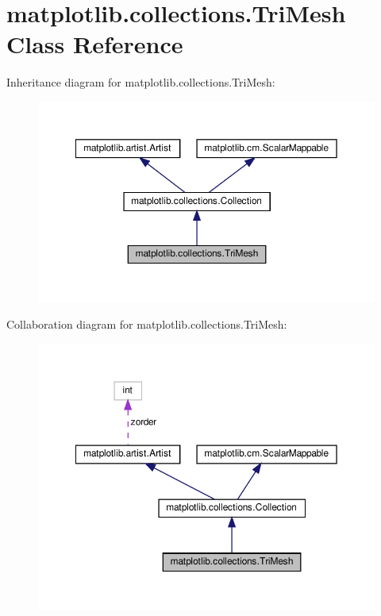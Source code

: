 \hypertarget{classmatplotlib_1_1collections_1_1TriMesh}{}\section{matplotlib.\+collections.\+Tri\+Mesh Class Reference}
\label{classmatplotlib_1_1collections_1_1TriMesh}


Inheritance diagram for matplotlib.\+collections.\+Tri\+Mesh\+:
\nopagebreak
\begin{figure}[H]
\begin{center}
\leavevmode
\includegraphics[width=350pt]{classmatplotlib_1_1collections_1_1TriMesh__inherit__graph}
\end{center}
\end{figure}


Collaboration diagram for matplotlib.\+collections.\+Tri\+Mesh\+:
\nopagebreak
\begin{figure}[H]
\begin{center}
\leavevmode
\includegraphics[width=350pt]{classmatplotlib_1_1collections_1_1TriMesh__coll__graph}
\end{center}
\end{figure}
